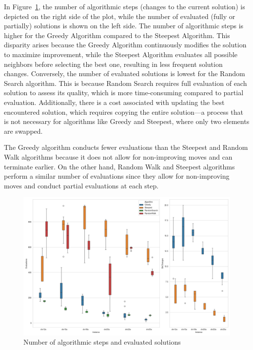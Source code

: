 \pagebreak

In Figure~\ref{fig:2}, the number of algorithmic steps (changes to the current solution) is depicted on the right side of the plot,
while the number of evaluated (fully or partially) solutions is shown on the left side.
The number of algorithmic steps is higher for the Greedy Algorithm compared to the Steepest Algorithm.
This disparity arises because the Greedy Algorithm continuously modifies the solution to maximize improvement,
while the Steepest Algorithm evaluates all possible neighbors before selecting the best one, resulting in less frequent solution changes.
Conversely, the number of evaluated solutions is lowest for the Random Search algorithm.
This is because Random Search requires full evaluation of each solution to assess its quality, which is more time-consuming compared to partial evaluation.
Additionally, there is a cost associated with updating the best encountered solution,
which requires copying the entire solution—a process that is not necessary for algorithms like Greedy and Steepest, where only two elements are swapped.

The Greedy algorithm conducts fewer evaluations than the Steepest and Random Walk algorithms because it does not allow for non-improving moves
and can terminate earlier.
On the other hand, Random Walk and Steepest algorithms perform a similar number of evaluations
since they allow for non-improving moves and conduct partial evaluations at each step.


\begin{figure}[H]
    \centering
    \includegraphics[width=1.0\textwidth]{pics/evaluations_sln_changes_box_plot}
    \caption{Number of algorithmic steps and evaluated solutions}
    \label{fig:2}
\end{figure}

